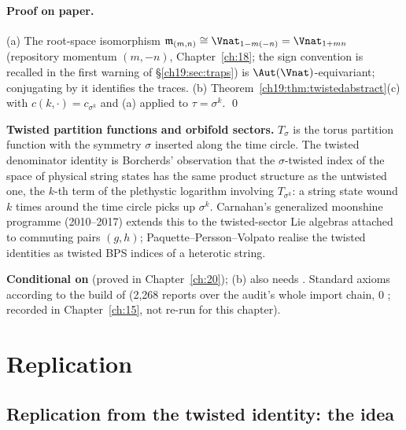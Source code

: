 \paragraph{Proof on paper.}  (a) The root-space isomorphism $\chnineteenm_{(m,n)}\cong\Vnat_{1-m(-n)}=\Vnat_{1+mn}$ (repository momentum
$(m,-n)$, Chapter~\ref{ch:18}; the sign convention is recalled in the first warning of \S\ref{ch19:sec:traps}) is $\Aut(\Vnat)$-equivariant; conjugating by it identifies the traces.  (b)
Theorem~\ref{ch19:thm:twistedabstract}(c) with $c(k,\cdot)=c_{\sigma^k}$ and (a) applied to $\tau=\sigma^k$. \qed
\begin{physics}
\textbf{Twisted partition functions and orbifold sectors.}  $T_{\sigma}$ is the torus partition function with the symmetry
$\sigma$ inserted along the time circle.  The twisted denominator identity is Borcherds' observation that the
$\sigma$-twisted index of the space of physical string states has the same product structure as the untwisted one, the
$k$-th term of the plethystic logarithm involving $T_{\sigma^k}$: a string state wound $k$ times around the time circle
picks up $\sigma^k$.  Carnahan's generalized moonshine programme (2010--2017) extends this to the twisted-sector
Lie algebras attached to commuting pairs $(g,h)$; Paquette--Persson--Volpato realise the twisted identities as twisted BPS
indices of a heterotic string.
\end{physics}
\begin{status}
\textbf{Conditional on}  (proved in Chapter~\ref{ch:20}); (b) also needs
.  Standard axioms according to the build of  (2,268 reports over the audit's whole import chain, 0 ; recorded in
Chapter~\ref{ch:15}, not re-run for this chapter).
\end{status}

\section{Replication}\label{ch19:sec:replication}

\subsection{Replication from the twisted identity: the idea}

